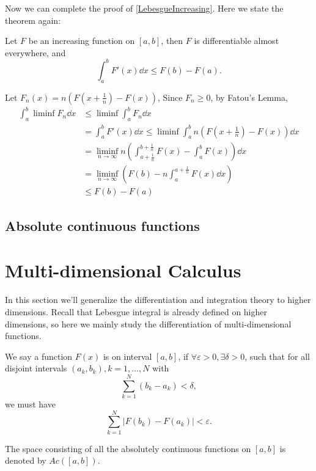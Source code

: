 Now we can complete the proof of \autoref{LebesgueIncreasing}.
Here we state the theorem again:

Let $F$ be an increasing function on $[a,b]$, then $F$ is
differentiable almost everywhere, and
\[
\int_{a}^{b} F'(x)\dd x \le F(b) - F(a).
\]

Let $F_n(x) = n(F(x+\frac{1}{n}) - F(x))$,
Since $F_n\ge 0$, by Fatou's Lemma,
\begin{align*}
\int_{a}^{b} \liminf F_n \dd x &\le \liminf \int_{a}^{b} F_n \dd x\\
&= \int_{a}^{b} F'(x)\dd x \le \liminf \int_{a}^{b} n\left(
F\left(x+\frac{1}{n}\right) - F(x)\right)\dd x\\
&= \liminf_{n \to \infty} n\left(\int_{a+\frac{1}{n}}^{b+\frac{1}{n}} F(x)
- \int_{a}^{b} F(x)\right)\dd x\\
&= \liminf_{n\to \infty} \left(F(b) - n \int_{a}^{a+\frac{1}{n}} F(x)\dd x\right)\\
&\le F(b) - F(a)
\end{align*}

\subsection{Absolute continuous functions}
\label{sub:Absolute continuous functions}

\section{Multi-dimensional Calculus}
\label{sec:Multi-dimensional Calculus}

In this section we'll generalize the differentiation and integration theory
to higher dimensions. Recall that Lebesgue integral is already
defined on higher dimensions, so here we mainly study the differentiation
of multi-dimensional functions.

\begin{definition}
	We say a function $F(x)$ is  on
	interval $[a,b]$, if $\forall \varepsilon>0, \exists \delta>0$,
	such that for all disjoint intervals $(a_k, b_k), k = 1,\dots,N$ with
	\[
	\sum_{k=1}^{N} (b_k - a_k) < \delta,
	\]
	we must have
	\[
	\sum_{k=1}^{N} |F(b_k) - F(a_k)| < \varepsilon.
	\]

	The space consisting of all the absolutely continuous functions on $[a,b]$
	is denoted by $Ac([a,b])$.
\end{definition}

